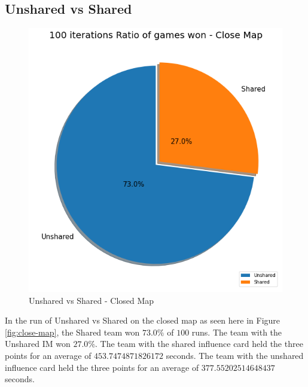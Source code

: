 \documentclass[]{report}
\begin{document}
		\subsection{Unshared vs Shared}
		\begin{figure}[h!]
			\centering
			\includegraphics[width=0.9\linewidth]{"Images/100 Games Unshared vs Shared Close Map"}
			\caption[Unshared vs Shared - Closed Map]{Unshared vs Shared - Closed Map}
			\label{fig:100-games-unshared-vs-shared-close-map}
		\end{figure}
	In the run of Unshared vs Shared on the closed map as seen here in Figure \ref{fig:close-map}, the Shared team won $73.0\%$ of $100$ runs. The team with the Unshared \ac{IM} won $27.0\%$. The team with the shared influence card held the three points for an average of $453.7474871826172$ seconds.
	The team with the unshared influence card held the three points for an average of $377.55202514648437$ seconds.
	
		
		\clearpage
\end{document}
